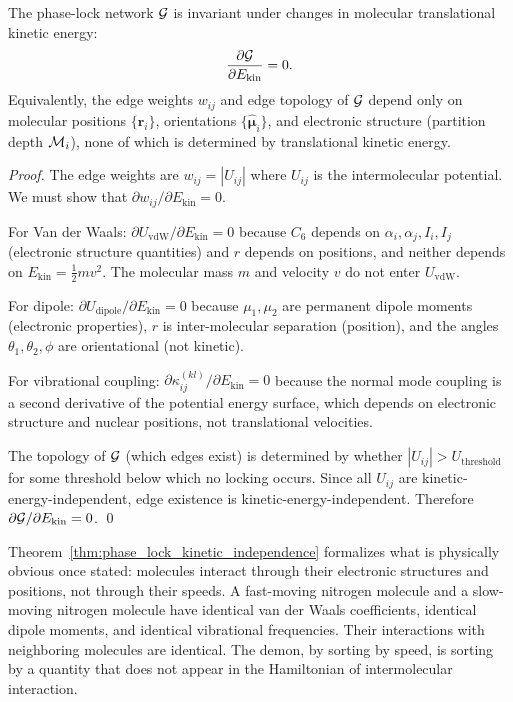 \begin{theorem}
\label{thm:phase_lock_kinetic_independence}
The phase-lock network $\mathcal{G}$ is invariant under changes in molecular
translational kinetic energy:
\begin{equation}
  \frac{\partial \mathcal{G}}{\partial E_{\mathrm{kin}}} = 0.
  \label{eq:phase_lock_kinetic_independence}
\end{equation}
Equivalently, the edge weights $w_{ij}$ and edge topology of $\mathcal{G}$
depend only on molecular positions $\{\mathbf{r}_i\}$, orientations
$\{\hat{\boldsymbol{\mu}}_i\}$, and electronic structure (partition depth
$\mathcal{M}_i$), none of which is determined by translational kinetic energy.
\end{theorem}

\begin{proof}
The edge weights are $w_{ij} = |U_{ij}|$ where $U_{ij}$ is the intermolecular
potential. We must show that $\partial w_{ij} / \partial E_{\mathrm{kin}} = 0$.

For Van der Waals: $\partial U_{\mathrm{vdW}} / \partial E_{\mathrm{kin}} = 0$
because $C_6$ depends on $\alpha_i, \alpha_j, I_i, I_j$ (electronic structure
quantities) and $r$ depends on positions, and neither depends on $E_{\mathrm{kin}} = \frac{1}{2}mv^2$.
The molecular mass $m$ and velocity $v$ do not enter $U_{\mathrm{vdW}}$.

For dipole: $\partial U_{\mathrm{dipole}} / \partial E_{\mathrm{kin}} = 0$
because $\mu_1, \mu_2$ are permanent dipole moments (electronic properties),
$r$ is inter-molecular separation (position), and the angles $\theta_1, \theta_2, \phi$
are orientational (not kinetic).

For vibrational coupling: $\partial \kappa_{ij}^{(kl)} / \partial E_{\mathrm{kin}} = 0$
because the normal mode coupling is a second derivative of the potential energy
surface, which depends on electronic structure and nuclear positions, not
translational velocities.

The topology of $\mathcal{G}$ (which edges exist) is determined by whether
$|U_{ij}| > U_{\mathrm{threshold}}$ for some threshold below which no locking
occurs. Since all $U_{ij}$ are kinetic-energy-independent, edge existence is
kinetic-energy-independent. Therefore $\partial \mathcal{G} / \partial E_{\mathrm{kin}} = 0$. \qed
\end{proof}

\begin{remark}
Theorem~\ref{thm:phase_lock_kinetic_independence} formalizes what is physically
obvious once stated: molecules interact through their electronic structures
and positions, not through their speeds. A fast-moving nitrogen molecule and
a slow-moving nitrogen molecule have identical van der Waals coefficients,
identical dipole moments, and identical vibrational frequencies. Their
interactions with neighboring molecules are identical. The demon, by sorting
by speed, is sorting by a quantity that does not appear in the Hamiltonian
of intermolecular interaction.
\end{remark}

